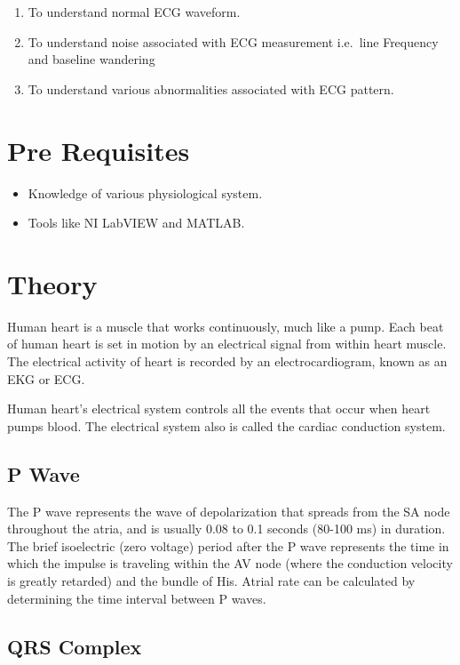 \documentclass[
  11pt,
  letterpaper,
  DIV=11,
  numbers=noendperiod]{scrreprt}
\providecommand{\tightlist}{%
  \setlength{\itemsep}{0pt}\setlength{\parskip}{0pt}}\usepackage{longtable,booktabs,array}
\begin{document}
\begin{enumerate}
\def\labelenumi{\arabic{enumi}.}
\tightlist
\item
  To understand normal ECG waveform.
\item
  To understand noise associated with ECG measurement i.e.~line
  Frequency and baseline wandering
\item
  To understand various abnormalities associated with ECG pattern.
\end{enumerate}

\section{Pre Requisites}\label{pre-requisites}

\begin{itemize}
\tightlist
\item
  Knowledge of various physiological system.
\item
  Tools like NI LabVIEW and MATLAB.
\end{itemize}

\section{Theory}\label{theory-5}

Human heart is a muscle that works continuously, much like a pump. Each
beat of human heart is set in motion by an electrical signal from within
heart muscle. The electrical activity of heart is recorded by an
electrocardiogram, known as an EKG or ECG.

Human heart's electrical system controls all the events that occur when
heart pumps blood. The electrical system also is called the cardiac
conduction system.

\subsection{P Wave}\label{p-wave}

The P wave represents the wave of depolarization that spreads from the
SA node throughout the atria, and is usually 0.08 to 0.1 seconds (80-100
ms) in duration. The brief isoelectric (zero voltage) period after the P
wave represents the time in which the impulse is traveling within the AV
node (where the conduction velocity is greatly retarded) and the bundle
of His. Atrial rate can be calculated by determining the time interval
between P waves.

\subsection{QRS Complex}\label{qrs-complex}
\end{document}
